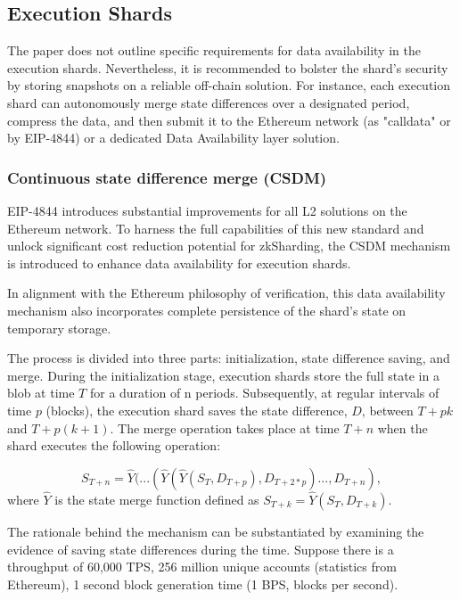 \subsection{Execution Shards}

The paper does not outline specific requirements for data availability in the execution shards. 
Nevertheless, it is recommended to bolster the shard's security by storing snapshots on a reliable 
off-chain solution. For instance, each execution shard can autonomously merge state differences over 
a designated period, compress the data, and then submit it to the Ethereum network (as "calldata" or 
by EIP-4844) or a dedicated Data Availability layer solution.

\subsubsection{Continuous state difference merge (CSDM)}


EIP-4844 introduces substantial improvements for all L2 solutions on the Ethereum network. 
To harness the full capabilities of this new standard and unlock significant cost reduction potential for zkSharding, 
 the CSDM mechanism is introduced to enhance data availability for execution shards.

In alignment with the Ethereum philosophy of verification, this data availability mechanism 
also incorporates complete persistence of the shard's state on temporary storage. 

The process is divided into three parts: initialization, state difference saving, and merge. 
During the initialization stage, execution shards store the full state in a blob at time $T$ for 
a duration of n periods. Subsequently, at regular intervals of time $p$ (blocks), the execution 
shard saves the state difference, $D$, between $T+pk$ and $T+p(k+1)$. The merge operation takes place 
at time $T+n$ when the shard executes the following operation:

\[
    S_{T+n} = \hat{Y}(...(\hat{Y}(\hat{Y}(S_T, D_{T+p}), D_{T+2*p})..., D_{T+n}),
\]
where $\hat{Y}$ is the state merge function defined as $S_{T+k} = \hat{Y}(S_T, D_{T+k})$.

The rationale behind the mechanism can be substantiated by examining the evidence of saving 
state differences during the time. Suppose there is a throughput of 60,000 TPS, 256 million 
unique accounts (statistics from Ethereum), 1 second block generation time (1 BPS, blocks per second).

